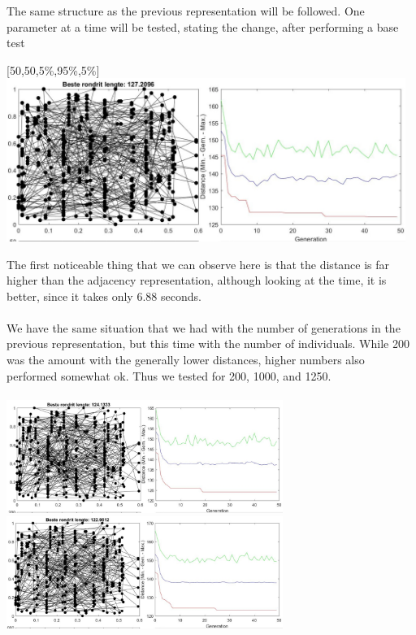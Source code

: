 The same structure as the previous representation will be followed. One
parameter at a time will be tested, stating the change, after
performing a base test
\begin{center}
[50,50,5\%,95\%,5\%]\\
\includegraphics[width=13cm]{img/specific/order_crossover/general_1.jpg}
\end{center}

The first noticeable thing that we can observe here is that the distance
is far higher than the adjacency representation, although looking at the
time, it is better, since it takes only 6.88 seconds.\\
\\
We have the same situation that we had with the number of generations in the
previous representation, but this time with the number of individuals. While
200 was the amount with the generally lower distances, higher numbers also
performed somewhat ok. Thus we tested for 200, 1000, and 1250.\\

\text{\big[200,50,5\%,95\%,5\%\big]}
\hfill
\text{\big[1000,50,50\%,95\%,5\%\big]} \\
\includegraphics[width=9cm]{img/specific/order_crossover/general_2.jpg}
\hfill
\includegraphics[width=9cm]{img/specific/order_crossover/general_3.jpg}

